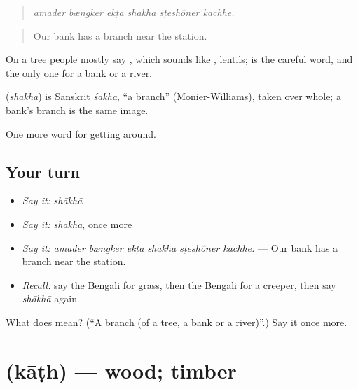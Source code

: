\begin{quote}
     
\end{quote}

\begin{quote}
\emph{āmāder bængker ekṭā shākhā sṭeshôner kāchhe.}
\end{quote}

\begin{quote}
Our bank has a branch near the station.
\end{quote}

On a tree people mostly say , which sounds like , lentils;  is the careful word, and the only one for a bank or a river.

\begin{cousinweb}
\textbf{} (\emph{shākhā}) is Sanskrit \emph{śākhā}, \textquotedblleft{}a branch\textquotedblright{} (Monier-Williams), taken over whole; a bank's branch is the same image.
\end{cousinweb}

\begin{grammarlens}[title={What you've built}]
One more word for getting around.
\end{grammarlens}

\subsection*{Your turn}
\begin{itemize}
\raggedright
  \item \emph{Say it:} \emph{shākhā}
  \item \emph{Say it:} \emph{shākhā}, once more
  \item \emph{Say it:} \emph{āmāder bængker ekṭā shākhā sṭeshôner kāchhe.} — Our bank has a branch near the station.
  \item \emph{Recall:} say the Bengali for grass, then the Bengali for a creeper, then say \emph{shākhā} again
\end{itemize}

\begin{tcolorbox}[breakable,colback=teal!4,colframe=teal!35!black,title={Before you move on}]
What does  mean? (\textquotedblleft{}A branch (of a tree, a bank or a river)\textquotedblright{}.) Say it once more.
\end{tcolorbox}
\section[\texorpdfstring{\bn{কাঠ} (kāṭh)}{কাঠ (kāṭh)}]{ (kāṭh) — wood; timber}

